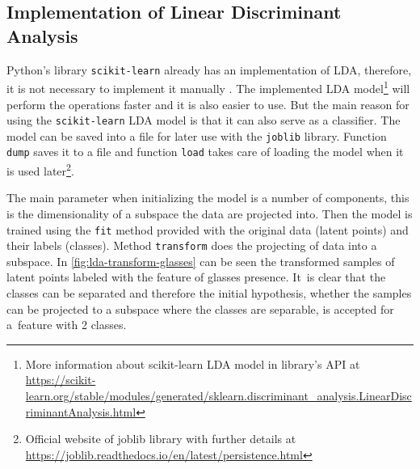 \subsection*{Implementation of Linear Discriminant Analysis}
Python's library \texttt{scikit-learn} already has an implementation of LDA, therefore, it is not necessary to implement it manually \cite{scikit-learn}. The implemented LDA model\footnote{More information about scikit-learn LDA model in library's API at \url{https://scikit-learn.org/stable/modules/generated/sklearn.discriminant_analysis.LinearDiscriminantAnalysis.html}} will perform the operations faster and it is also easier to use. But the main reason for using the \texttt{scikit-learn} LDA model is that it can also serve as a classifier. The model can be saved into a file for later use with the \texttt{joblib} library. Function \texttt{dump} saves it to a file and function \texttt{load} takes care of loading the model when it is used later\footnote{Official website of joblib library with further details at \url{https://joblib.readthedocs.io/en/latest/persistence.html}}.

The main parameter when initializing the model is a number of components, this is the dimensionality of a subspace the data are projected into. Then the model is trained using the \texttt{fit} method provided with the original data (latent points) and their labels (classes). Method \texttt{transform} does the projecting of data into a subspace. In \autoref{fig:lda-transform-glasses} can be seen the transformed samples of latent points labeled with the feature of glasses presence. It~is clear that the classes can be separated and therefore the initial hypothesis, whether the samples can be projected to a subspace where the classes are separable, is accepted for a~feature with 2 classes.

